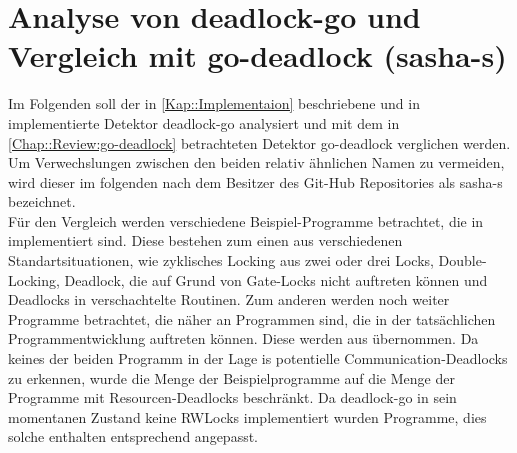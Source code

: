 \chapter{Analyse von deadlock-go und Vergleich mit 
    go-deadlock (sasha-s)}
Im Folgenden soll der in \ref{Kap::Implementaion} beschriebene und in 
\cite{implementation} implementierte Detektor \glqq deadlock-go \grqq analysiert 
und mit dem in 
\ref{Chap::Review:go-deadlock} betrachteten Detektor \glqq go-deadlock \grqq verglichen
werden. Um Verwechslungen zwischen den beiden relativ ähnlichen Namen zu vermeiden,
wird dieser im folgenden nach dem Besitzer des Git-Hub Repositories als sasha-s
bezeichnet.\\
Für den Vergleich werden verschiedene Beispiel-Programme betrachtet, die in 
\cite{examples} implementiert sind. Diese bestehen zum einen aus verschiedenen 
Standartsituationen, wie zyklisches Locking aus zwei oder drei Locks, 
Double-Locking, Deadlock, die auf 
Grund von Gate-Locks nicht auftreten können und Deadlocks in verschachtelte Routinen. 
Zum anderen werden noch weiter 
Programme betrachtet, die näher an Programmen sind, die in der tatsächlichen 
Programmentwicklung auftreten können. Diese werden aus \cite{gobench} übernommen.
Da keines der beiden Programm in der Lage is potentielle Communication-Deadlocks
zu erkennen, wurde die Menge der Beispielprogramme auf die Menge der Programme 
mit Resourcen-Deadlocks beschränkt. Da deadlock-go in sein momentanen Zustand 
keine RWLocks implementiert wurden Programme, dies solche enthalten entsprechend
angepasst.
